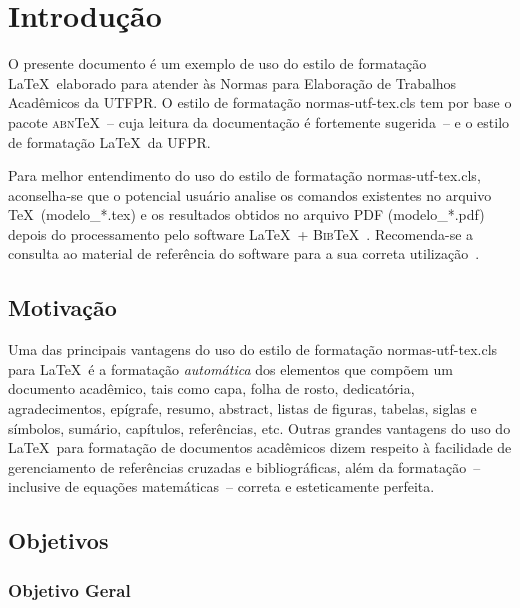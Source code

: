 \chapter{Introdu\c{c}\~ao}

O presente documento \'e um exemplo de uso do estilo de formata\c{c}\~ao \LaTeX\ elaborado para atender \`as Normas para Elabora\c{c}\~ao de Trabalhos Acad\^emicos da UTFPR. O estilo de formata\c{c}\~ao {\ttfamily normas-utf-tex.cls} tem por base o pacote \textsc{abn}\TeX~-- cuja leitura da documenta\c{c}\~ao \cite{abnTeX2009} \'e fortemente sugerida~-- e o estilo de formata\c{c}\~ao \LaTeX\ da UFPR.

Para melhor entendimento do uso do estilo de formata\c{c}\~ao {\ttfamily nor\-mas-utf-tex.\-cls}, aconselha-se que o potencial usu\'ario analise os comandos existentes no arquivo \TeX\ ({\ttfamily mo\-de\-lo\_*.tex}) e os resultados obtidos no arquivo PDF ({\ttfamily mo\-de\-lo\_*.pdf}) depois do processamento pelo software \LaTeX\ + \textsc{Bib}\TeX~\cite{LaTeX2009,BibTeX2009}. Recomenda-se a consulta ao material de refer\^encia do software para a sua correta utiliza\c{c}\~ao~\cite{Lamport1986,Buerger1989,Kopka2003,Mittelbach2004}.

\section{Motiva\c{c}\~ao}

Uma das principais vantagens do uso do estilo de formata\c{c}\~ao {\ttfamily normas-utf-tex.cls} para \LaTeX\ \'e a formata\c{c}\~ao \textit{autom\'atica} dos elementos que comp\~oem um documento acad\^emico, tais como capa, folha de rosto, dedicat\'oria, agradecimentos, ep\'igrafe, resumo, abstract, listas de figuras, tabelas, siglas e s\'imbolos, sum\'ario, cap\'itulos, refer\^encias, etc. Outras grandes vantagens do uso do \LaTeX\ para formata\c{c}\~ao de documentos acad\^emicos dizem respeito \`a facilidade de gerenciamento de refer\^encias cruzadas e bibliogr\'aficas, al\'em da formata\c{c}\~ao~-- inclusive de equa\c{c}\~oes  matem\'aticas~-- correta e esteticamente perfeita.

\section{Objetivos}

\subsection{Objetivo Geral}

